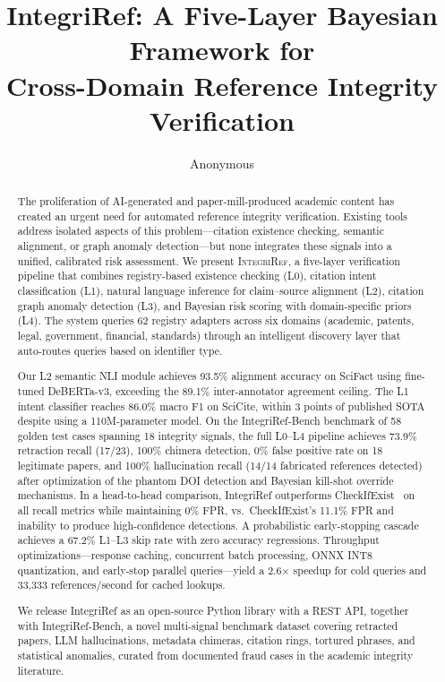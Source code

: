 \documentclass[sigconf,nonacm]{acmart}
\begin{document}
\title{IntegriRef: A Five-Layer Bayesian Framework for\\Cross-Domain Reference Integrity Verification}

\author{Anonymous}

\begin{abstract}
The proliferation of AI-generated and paper-mill-produced academic content has created an urgent need for automated reference integrity verification.
Existing tools address isolated aspects of this problem---citation existence checking, semantic alignment, or graph anomaly detection---but none integrates these signals into a unified, calibrated risk assessment.
We present \textsc{IntegriRef}, a five-layer verification pipeline that combines registry-based existence checking (L0), citation intent classification (L1), natural language inference for claim--source alignment (L2), citation graph anomaly detection (L3), and Bayesian risk scoring with domain-specific priors (L4).
The system queries 62 registry adapters across six domains (academic, patents, legal, government, financial, standards) through an intelligent discovery layer that auto-routes queries based on identifier type.

Our L2 semantic NLI module achieves 93.5\% alignment accuracy on SciFact using fine-tuned DeBERTa-v3, exceeding the 89.1\% inter-annotator agreement ceiling.
The L1 intent classifier reaches 86.0\% macro F1 on SciCite, within 3 points of published SOTA despite using a 110M-parameter model.
On the IntegriRef-Bench benchmark of 58 golden test cases spanning 18 integrity signals, the full L0--L4 pipeline achieves 73.9\% retraction recall (17/23), 100\% chimera detection, 0\% false positive rate on 18 legitimate papers, and 100\% hallucination recall (14/14 fabricated references detected) after optimization of the phantom DOI detection and Bayesian kill-shot override mechanisms.
In a head-to-head comparison, IntegriRef outperforms CheckIfExist~\cite{alkhalaf2025} on all recall metrics while maintaining 0\% FPR, vs.\ CheckIfExist's 11.1\% FPR and inability to produce high-confidence detections.
A probabilistic early-stopping cascade achieves a 67.2\% L1--L3 skip rate with zero accuracy regressions.
Throughput optimizations---response caching, concurrent batch processing, ONNX INT8 quantization, and early-stop parallel queries---yield a 2.6$\times$ speedup for cold queries and 33,333 references/second for cached lookups.

We release IntegriRef as an open-source Python library with a REST API, together with IntegriRef-Bench, a novel multi-signal benchmark dataset covering retracted papers, LLM hallucinations, metadata chimeras, citation rings, tortured phrases, and statistical anomalies, curated from documented fraud cases in the academic integrity literature.
\end{abstract}
\end{document}
